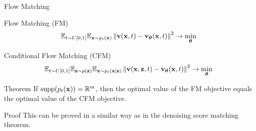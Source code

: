 \documentclass{beamer}
\renewcommand{\eqpause}{}
\begin{document}
\begin{frame}{Flow Matching}
	\begin{block}{Flow Matching (FM)}
		\vspace{-0.3cm}
		\[
			\mathbb{E}_{t \sim U[0, 1]} \mathbb{E}_{\mathbf{x} \sim p_t(\mathbf{x})}\left\| \mathbf{v}(\mathbf{x}, t) - \mathbf{v}_{\boldsymbol{\theta}}(\mathbf{x}, t) \right\|^2 \rightarrow \min_{\boldsymbol{\theta}}
		\]
		\vspace{-0.3cm}
	\end{block}
	\begin{block}{Conditional Flow Matching (CFM)}
		\vspace{-0.3cm}
		\[
			\mathbb{E}_{t \sim U[0, 1]} \mathbb{E}_{\mathbf{z} \sim p(\mathbf{z})} \mathbb{E}_{\mathbf{x} \sim p_t(\mathbf{x} | \mathbf{z})}\left\| \mathbf{v}(\mathbf{x}, \mathbf{z}, t) - \mathbf{v}_{\boldsymbol{\theta}}(\mathbf{x}, t) \right\|^2 \rightarrow \min_{\boldsymbol{\theta}}
		\]
		\vspace{-0.5cm}
	\end{block}
    \eqpause
	\begin{block}{Theorem}
		If $\operatorname{supp}(p_t(\mathbf{x})) = \mathbb{R}^m$, then the optimal value of the FM objective equals the optimal value of the CFM objective.
	\end{block}
    \eqpause
	\begin{block}{Proof}
		This can be proved in a similar way as in the denoising score matching theorem.
	\end{block}
\end{frame}
\end{document}
